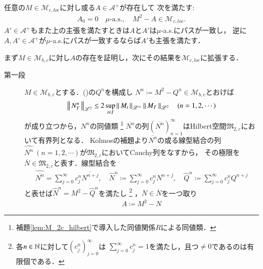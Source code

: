 	\begin{screen}
		\begin{thm}[二次変分の存在]
			任意の$M \in \mathcal{M}_{c,loc}$に対し或る$A \in \mathcal{A}^+$が存在して
			次を満たす:
			\begin{align}
				A_0 = 0\quad \mbox{$\mu$-a.s.},
				\quad M^2 - A \in \mathcal{M}_{c,loc}.
			\end{align}
			$A' \in \mathcal{A}^+$もまた上の主張を満たすときは$A$と$A'$は$\mu$-a.s.にパスが一致し，
			逆に$A,A' \in \mathcal{A}^+$が$\mu$-a.s.にパスが一致するならば$A'$も主張を満たす．
			\label{thm:existence_of_quadratic_variation}
		\end{thm}
	\end{screen}
	
	\begin{prf}
		まず$M \in \mathcal{M}_{b,c}$に対し$A$の存在を証明し，次にその結果を$\mathcal{M}_{c,loc}$に拡張する．
		\begin{description}
			\item[第一段]
				$M \in \mathcal{M}_{b,c}$とする．()の$Q^n$を構成し
				$N^n \coloneqq M^2 - Q^n \in \mathcal{M}_{b,c}$とおけば
				\begin{align}
					\left\|\, N_T^n\, \right\|_{\mathscr{L}^2} \leq 2 \operatorname*{sup}_{t \in I} \left\|\, M_t\, \right\|_{\mathscr{L}^\infty} \left\|\, M_T\, \right\|_{\mathscr{L}^2} \quad (n=1,2,\cdots)
				\end{align}
				が成り立つから，$N^n$の同値類
				\footnote{
					補題\ref{lem:M_2c_hilbert}で導入した同値関係$R$による同値類．
				}
				$\overline{N^n}$の列$(\overline{N^n})_{n=1}^{\infty}$はHilbert空間$\mathfrak{M}_{2,c}$において有界列となる．
				Kolmosの補題より$\overline{N^n}$の或る線型結合の列$\hat{\overline{N^n}}\ (n=1,2,\cdots)$が$\mathfrak{M}_{2,c}$においてCauchy列をなすから，
				その極限を$\overline{N} \in \mathfrak{M}_{2,c}$と表す．線型結合を
				\begin{align}
					\hat{\overline{N^n}} = \sum_{j=0}^{\infty} c^n_j \overline{N^{n+j}}, \quad
					\hat{N}^n \coloneqq \sum_{j=0}^{\infty} c^n_j N^{n+j}, \quad
					\hat{Q}^n \coloneqq \sum_{j=0}^{\infty} c^n_j Q^{n+j}
				\end{align}
				と表せば$\hat{N}^n = M^2 - \hat{Q}^n$を満たし
				\footnote{
					各$n \in \mathbb{N}$に対して$(c^n_j)_{j=0}^{\infty}$は
					$\sum_{j=0}^{\infty} c^n_j = 1$を満たし，且つ$\neq 0$であるのは有限個である．
				}
				，$N \in \overline{N}$を一つ取り
				\begin{align}
					A \coloneqq M^2 - N \label{eq:thm_quadratic_variation_0}
				\end{align}

\end{description}
\end{prf}
